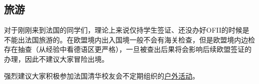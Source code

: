 \subsection{旅游}
对于刚刚来到法国的同学们，理论上来说仅持学生签证、还没办好OFII的时候是不能出法国旅游的。在欧盟境内出入国境一般不会有海关检查，但是欧盟境内边检存在抽查（从经验中看德语区更严格），一旦被查出后果将会影响后续欧盟签证的办理，因此不建议大家冒险出境。

强烈建议大家积极参加法国清华校友会不定期组织的\href{https://www.tsinghua-france.org/category/activities/outdoor/}{户外活动}。
